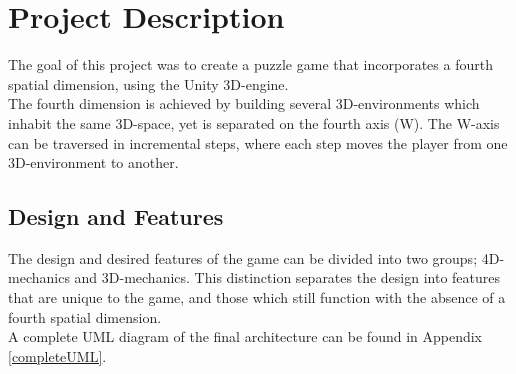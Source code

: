 \section{Project Description}
The goal of this project was to create a puzzle game that incorporates a fourth spatial dimension, using the Unity 3D-engine.\\

The fourth dimension is achieved by building several 3D-environments which inhabit the same 3D-space, yet is separated on the fourth axis (W). The W-axis can be traversed in incremental steps, where each step moves the player from one 3D-environment to another.
 
\subsection{Design and Features}
The design and desired features of the game can be divided into two groups; 4D-mechanics and 3D-mechanics. This distinction separates the design into features that are unique to the game, and those which still function with the absence of a fourth spatial dimension.\\

A complete UML diagram of the final architecture can be found in Appendix \ref{completeUML}.

